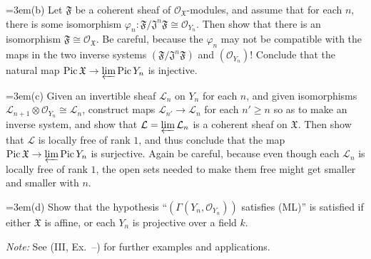 {\noindent\hangindent=3em\hspace*{1.7em}(b) Let $\mathfrak F$ be a coherent sheaf of $\mathcal O_{\mathfrak X}$-modules, and assume that for each $n$, there is some isomorphism $\varphi_n\colon\mathfrak F/\mathfrak J^n\mathfrak F\cong\mathcal O_{Y_n}$. Then show that there is an isomorphism $\mathfrak F\cong\mathcal O_{\mathfrak X}$. Be careful, because the $\varphi_n$ may not be compatible with the maps in the two inverse systems $(\mathfrak F/\mathfrak J^n\mathfrak F)$ and $(\mathcal O_{Y_n})$! Conclude that the natural map $\operatorname{Pic}\mathfrak X\to\varprojlim\operatorname{Pic}Y_n$ is injective.

\noindent\hangindent=3em\hspace*{1.7em}(c) Given an invertible sheaf $\mathcal L_n$ on $Y_n$ for each $n$, and given isomorphisms $\mathcal L_{n+1}\otimes\mathcal O_{Y_n}\cong\mathcal L_n$, construct maps $\mathcal L_{n'}\to\mathcal L_n$ for each $n'\ge n$ so as to make an inverse system, and show that $\mathcal L=\varprojlim\mathcal L_n$ is a coherent sheaf on $\mathfrak X$. Then show that $\mathcal L$ is locally free of rank $1$, and thus conclude that the map $\operatorname{Pic}\mathfrak X\to\varprojlim\operatorname{Pic}Y_n$ is surjective. Again be careful, because even though each $\mathcal L_n$ is locally free of rank $1$, the open sets needed to make them free might get smaller and smaller with $n$.

\noindent\hangindent=3em\hspace*{1.7em}(d) Show that the hypothesis \textquotedblleft{}$(\Gamma(Y_n,\mathcal O_{Y_n}))$ satisfies (ML)\textquotedblright{} is satisfied if either $\mathfrak X$ is affine, or each $Y_n$ is projective over a field $k$.

\noindent\hspace*{3em}\emph{Note:} See (III, Ex.~--) for further examples and applications.}
